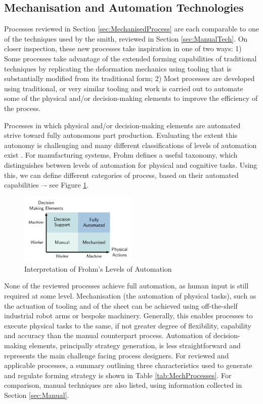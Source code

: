  
\subsection{Mechanisation and Automation Technologies} \label{sec:MechandAuto}

Processes reviewed in Section \ref{sec:MechanisedProcess} are each comparable to one of the techniques used by the smith, reviewed in Section \ref{sec:ManualTech}. On closer inspection, these new processes take inspiration in one of two ways: 1) Some processes take advantage of the extended forming capabilities of traditional techniques by replicating the deformation mechanics using tooling that is substantially modified from its traditional form; 2) Most  processes are developed using traditional, or very similar tooling and work is carried out to automate some of the physical and/or decision-making elements to improve the efficiency of the process. 

Processes in which physical and/or decision-making elements are automated strive toward fully autonomous part production. Evaluating the extent this autonomy is challenging and many different classifications of levels of automation exist \citep{Vagia2015AProposed}. For manufacturing systems, Frohm defines a useful taxonomy, which distinguishes between levels of automation for physical and cognitive tasks. Using this, we can define different categories of process, based on their automated capabilities –- see Figure \ref{fig:LoA}. 

\begin{figure}[h]
    \centering
    \includegraphics[width=0.5\textwidth]{Diagrams/LoADiagram.pdf}
    \caption{Interpretation of Frohm's Levels of Automation \citep{Frohm2008LevelsManufacturing}}
    \label{fig:LoA}
\end{figure}

None of the reviewed processes achieve full automation, as human input is still required at some level. Mechanisation (the automation of physical tasks), such as the actuation of tooling and of the sheet can be achieved using off-the-shelf industrial robot arms or bespoke machinery. Generally, this enables processes to execute physical tasks to the same, if not greater degree of flexibility, capability and accuracy than the manual counterpart process. Automation of decision-making elements, principally strategy generation, is less straightforward and represents the main challenge facing process designers. For reviewed and applicable processes, a summary outlining three characteristics used to generate and regulate forming strategy is shown in Table \ref{tab:MechProcesses}. For comparison, manual techniques are also listed, using information collected in Section \ref{sec:Manual}.

